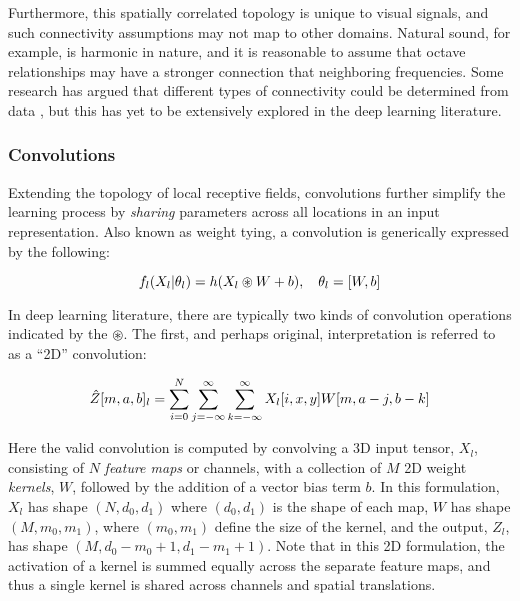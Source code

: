 Furthermore, this spatially correlated topology is unique to visual signals, and such connectivity assumptions may not map to other domains.
Natural sound, for example, is harmonic in nature, and it is reasonable to assume that octave relationships may have a stronger connection that neighboring frequencies.
Some research has argued that different types of connectivity could be determined from data \cite{Coates2012?}, but this has yet to be extensively explored in the deep learning literature.


\subsubsection{Convolutions}

Extending the topology of local receptive fields, convolutions further simplify the learning process by \emph{sharing} parameters across all locations in an input representation.
Also known as weight tying, a convolution is generically expressed by the following:

\begin{equation}
\label{eq:convlayer}
\small
f_l(X_l \vert \theta_l) = h(X_{l} \circledast W + b), \quad \theta_l = [W, b]
\end{equation}

\noindent In deep learning literature, there are typically two kinds of convolution operations indicated by the $\circledast$.
The first, and perhaps original, interpretation is referred to as a ``2D'' convolution:

\begin{equation}
\label{eq:convolution}
\small
\hat{Z}[m, a, b]_l =\sum_{i=0}^{N} \sum_{j=-\infty}^{\infty} \sum_{k=-\infty}^{\infty} X_l[i, x, y]W[m, a - j, b - k]
\end{equation}

\noindent Here the valid convolution is computed by convolving a 3D input tensor, $X_l$, consisting of $N$ \emph{feature maps} or channels, with a collection of $M$ 2D weight \emph{kernels}, $W$, followed by the addition of a vector bias term $b$.
In this formulation, $X_l$ has shape $(N, d_0, d_1)$ where $(d_0,d_1)$ is the shape of each map, $W$ has shape $(M, m_0, m_1)$, where $(m_0,m_1)$ define the size of the kernel, and the output, $Z_l$, has shape $(M, d_0-m_0+1, d_1-m_1+1)$.
Note that in this 2D formulation, the activation of a kernel is summed equally across the separate feature maps, and thus a single kernel is shared across channels and spatial translations.

